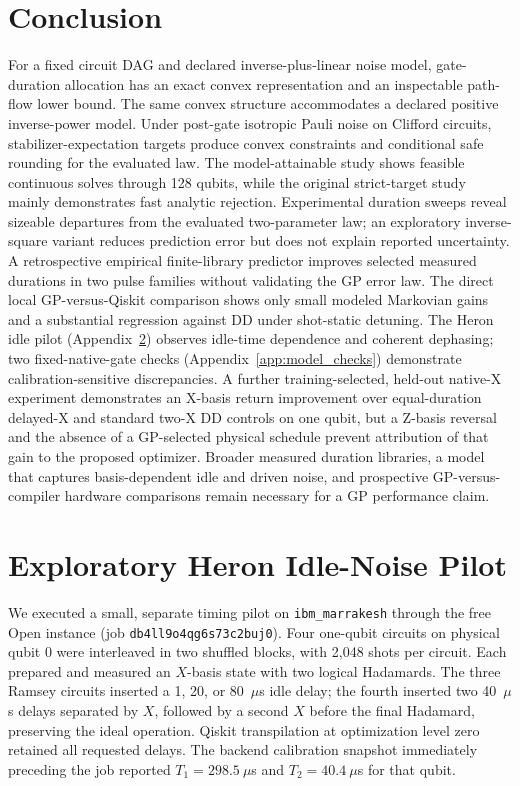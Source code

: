 \documentclass[10pt,letterpaper,journal]{IEEEtran}
\begin{document}
\section{Conclusion}
For a fixed circuit DAG and declared inverse-plus-linear noise model, gate-duration allocation has an exact convex representation and an inspectable path-flow lower bound. The same convex structure accommodates a declared positive inverse-power model. Under post-gate isotropic Pauli noise on Clifford circuits, stabilizer-expectation targets produce convex constraints and conditional safe rounding for the evaluated law. The model-attainable study shows feasible continuous solves through 128 qubits, while the original strict-target study mainly demonstrates fast analytic rejection. Experimental duration sweeps reveal sizeable departures from the evaluated two-parameter law; an exploratory inverse-square variant reduces prediction error but does not explain reported uncertainty. A retrospective empirical finite-library predictor improves selected measured durations in two pulse families without validating the GP error law. The direct local GP-versus-Qiskit comparison shows only small modeled Markovian gains and a substantial regression against DD under shot-static detuning. The Heron idle pilot (Appendix~\ref{app:idle_pilot}) observes idle-time dependence and coherent dephasing; two fixed-native-gate checks (Appendix~\ref{app:model_checks}) demonstrate calibration-sensitive discrepancies. A further training-selected, held-out native-X experiment demonstrates an X-basis return improvement over equal-duration delayed-X and standard two-X DD controls on one qubit, but a Z-basis reversal and the absence of a GP-selected physical schedule prevent attribution of that gain to the proposed optimizer. Broader measured duration libraries, a model that captures basis-dependent idle and driven noise, and prospective GP-versus-compiler hardware comparisons remain necessary for a GP performance claim.

\appendices

\section{Exploratory Heron Idle-Noise Pilot}\label{app:idle_pilot}
We executed a small, separate timing pilot on \texttt{ibm\_marrakesh} through the free Open instance (job \texttt{db4ll9o4qg6s73c2buj0}). Four one-qubit circuits on physical qubit 0 were interleaved in two shuffled blocks, with 2,048 shots per circuit. Each prepared and measured an $X$-basis state with two logical Hadamards. The three Ramsey circuits inserted a 1, 20, or 80~$\mu$s idle delay; the fourth inserted two 40~$\mu$s delays separated by $X$, followed by a second $X$ before the final Hadamard, preserving the ideal operation. Qiskit transpilation at optimization level zero retained all requested delays. The backend calibration snapshot immediately preceding the job reported $T_1=298.5~\mu$s and $T_2=40.4~\mu$s for that qubit.
\end{document}
